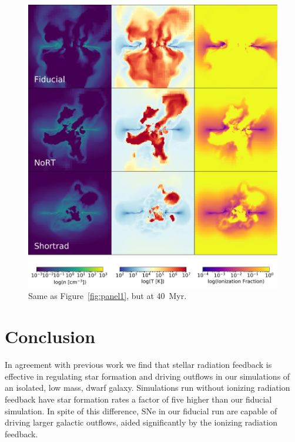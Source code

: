 \documentclass[twocolumn]{aastex62}
\begin{document}
\begin{figure}
\centering
\includegraphics[width=0.99\linewidth]{DD0160_fiducial_shortrad_nort}
\caption{Same as Figure~\ref{fig:panel1}, but at 40~Myr.}
\label{fig:panel2}
\end{figure}

\section{Conclusion}  \label{sec:conclusion}
In agreement with previous work we find that stellar radiation feedback is effective in regulating star formation and driving outflows in our simulations of an isolated, low mass, dwarf galaxy. Simulations run without ionizing radiation feedback have star formation rates a factor of five higher than our fiducial simulation. In spite of this difference, SNe in our fiducial run are capable of driving larger galactic outflows, aided significantly by the ionizing radiation feedback.
\end{document}
